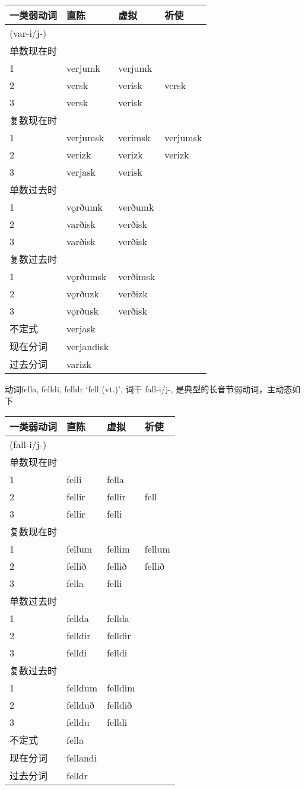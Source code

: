 \begin{longtable}{llll}
\toprule
一类弱动词 & 直陈 & 虚拟 & 祈使 \\
\midrule
\endhead
\bottomrule
\endfoot
(var-i/j-) & & & \\
单数现在时 & & & \\
1 & verjumk & verjumk & \\
2 & versk & verisk & versk \\
3 & versk & verisk & \\
复数现在时 & & & \\
1 & verjumsk & verimsk & verjumsk \\
2 & verizk & verizk & verizk \\
3 & verjask & verisk & \\
单数过去时 & & & \\
1 & vǫrðumk & verðumk & \\
2 & varðisk & verðisk & \\
3 & varðisk & verðisk & \\
复数过去时 & & & \\
1 & vǫrðumsk & verðimsk & \\
2 & vǫrðuzk & verðizk & \\
3 & vǫrðusk & verðisk & \\
不定式 & verjask & & \\
现在分词 & verjandisk & & \\
过去分词 & varizk & & \\
\end{longtable}

动词fella, felldi, felldr `fell (vt.)‌', 词干 fall-i/j-,
是典型的长音节弱动词，主动态如下

\begin{longtable}{llll}
\toprule
一类弱动词 & 直陈 & 虚拟 & 祈使 \\
\midrule
\endhead
\bottomrule
\endfoot
(fall-i/j-) & & & \\
单数现在时 & & & \\
1 & felli & fella & \\
2 & fellir & fellir & fell \\
3 & fellir & felli & \\
复数现在时 & & & \\
1 & fellum & fellim & fellum \\
2 & fellið & fellið & fellið \\
3 & fella & felli & \\
单数过去时 & & & \\
1 & fellda & fellda & \\
2 & felldir & felldir & \\
3 & felldi & felldi & \\
复数过去时 & & & \\
1 & felldum & felldim & \\
2 & fellduð & felldið & \\
3 & felldu & felldi & \\
不定式 & fella & & \\
现在分词 & fellandi & & \\
过去分词 & felldr & & \\
\end{longtable}

